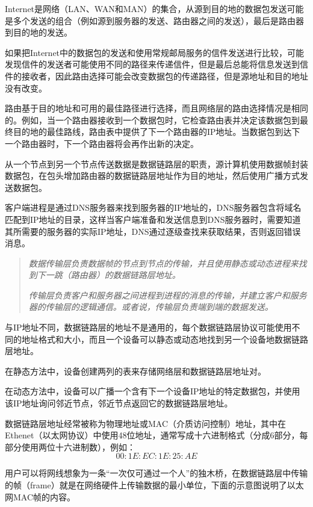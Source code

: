 Internet是网络（LAN、WAN和MAN）的集合，从源到目的地的数据包发送可能是多个发送的组合（例如源到服务器的发送、路由器之间的发送），最后是路由器到目的地的发送。

如果把Internet中的数据包的发送和使用常规邮局服务的信件发送进行比较，可能发现信件的发送者可能使用不同的路径来传递信件，但是最后总能将信息发送到信件的接收者，因此路由选择可能会改变数据包的传递路径，但是源地址和目的地址没有改变。

路由基于目的地址和可用的最佳路径进行选择，而且网络层的路由选择情况是相同的。例如，当一个路由器接收到一个数据包时，它检查路由表并决定该数据包到最终目的地的最佳路线，路由表中提供了下一个路由器的IP地址。当数据包到达下一个路由器时，下一个路由器将会再作出新的决定。

从一个节点到另一个节点传送数据是数据链路层的职责，源计算机使用数据帧封装数据包，在包头增加路由器的数据链路层地址作为目的地址，然后使用广播方式发送数据包。

客户端进程是通过DNS服务器来找到服务器的IP地址的，DNS服务器包含将域名匹配到IP地址的目录，这样当客户端准备和发送信息到DNS服务器时，需要知道其所需要的服务器的实际IP地址，DNS通过逐级查找来获取结果，否则返回错误消息。

\begin{quote}
\textsl{数据传输层负责数据帧的节点到节点的传输，并且使用静态或动态进程来找到下一跳（路由器）的数据链路层地址。}

\textsl{传输层负责客户和服务器之间进程到进程的消息的传输，并建立客户和服务器的传输层的逻辑通信。或者说，传输层负责端到端的数据发送。}
\end{quote}


与IP地址不同，数据链路层的地址不是通用的，每个数据链路层协议可能使用不同的地址格式和大小，而且一个设备可以静态或动态地找到另一个设备地数据链路层地址。

\begin{compactitem}
\item 在静态方法中，设备创建两列的表来存储网络层和数据链路层地址对。
\item 在动态方法中，设备可以广播一个含有下一个设备IP地址的特定数据包，并使用该IP地址询问邻近节点，邻近节点返回它的数据链路层地址。
\end{compactitem}

数据链路层地址经常被称为物理地址或MAC（介质访问控制）地址，其中在Ethenet（以太网协议）中使用48位地址，通常写成十六进制格式（分成6部分，每部分使用两位十六进制数），例如：
\[00:1E:EC:1E:25:AE\]

用户可以将网线想象为一条“一次仅可通过一个人”的独木桥，在数据链路层中传输的帧（frame）就是在网络硬件上传输数据的最小单位，下面的示意图说明了以太网MAC帧的内容。

